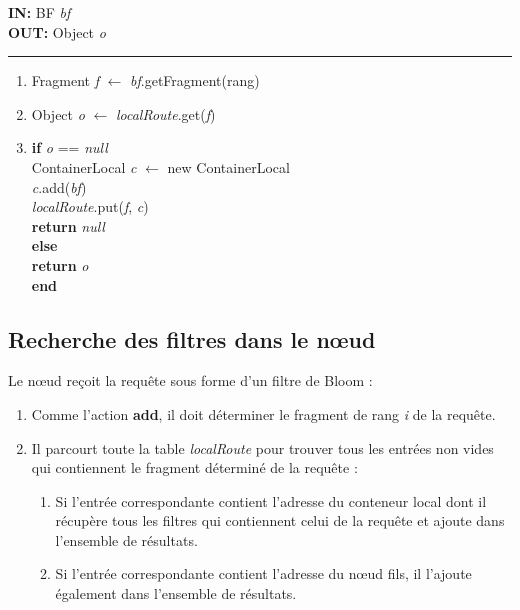 \documentclass[a4paper,11pt]{report}
\begin{document}
\begin{flushleft}
	\begin{framed}
		\textbf{IN:} BF \textit{bf}\\
		\textbf{OUT:} Object \textit{o}\\
		\noindent\rule{\linewidth}{0.5pt}

		\begin{enumerate}
			\item Fragment \textit{f} $\leftarrow$ \textit{bf}.getFragment(rang)
			\item Object \textit{o} $\leftarrow$ \textit{localRoute}.get(\textit{f})
			\item 
				\begin{tabbing}
					\textbf{if }\= \textit{o} == \textit{null}\\
						\> ContainerLocal \textit{c} $\leftarrow$ new ContainerLocal\\
						\> \textit{c}.add(\textit{bf})\\
						\> \textit{localRoute}.put(\textit{f}, \textit{c})\\
						\> \textbf{return} \textit{null}\\
					\textbf{else}\\
						\> \textbf{return} \textit{o}\\
					\textbf{end} 
				\end{tabbing}
		\end{enumerate}	
	\end{framed}
\end{flushleft}


\subsection{Recherche des filtres dans le nœud}
	Le nœud reçoit la requête sous forme d'un filtre de Bloom : 
	\begin{enumerate}
		\item Comme l'action \textbf{add}, il doit déterminer le fragment de rang \textit{i} de la requête.
		\item Il parcourt toute la table \textit{localRoute} pour trouver tous les entrées non vides qui contiennent le fragment déterminé de la requête :
			\begin{enumerate}
			\item Si l'entrée correspondante contient l'adresse du conteneur local dont il récupère tous les filtres qui contiennent celui de la requête et ajoute dans l'ensemble de résultats.
			\item Si l'entrée correspondante contient l'adresse du  nœud fils, il l'ajoute également dans l'ensemble de résultats.
			\end{enumerate}
	\end{enumerate}		
	
\end{document}
